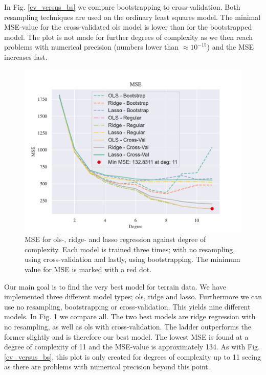 In Fig. \ref{cv_versus_bs} we compare bootstrapping to cross-validation. Both resampling techniques are used on the ordinary least squares model. The minimal MSE-value for the cross-validated ols model is lower than for the bootstrapped model. The plot is not made for further degrees of complexity as we then reach problems with numerical precision (numbers lower than $\approx 10^{-15}$) and the MSE increases fast.  

\begin{figure}[h!]
    \centering
    \includegraphics[width=1\linewidth]{project_1_alt/figures/figures_in_report/All_Terrain.pdf}
    \caption{MSE for ols-, ridge- and lasso regression against degree of complexity. Each model is trained three times; with no resampling, using cross-validation and lastly, using bootstrapping. The minimum value for MSE is marked with a red dot.}
    \label{all_terrain}
\end{figure}

Our main goal is to find the very best model for terrain data. We have implemented three different model types; ols, ridge and lasso. Furthermore we can use no resampling, bootstrapping or cross-validation. This yields nine different models. In Fig. \ref{all_terrain} we compare all. The two best models are ridge regression with no resampling, as well as ols with cross-validation. The ladder outperforms the former slightly and is therefore our best model. The lowest MSE is found at a degree of complexity of 11 and the MSE-value is approximately 134. As with Fig. \ref{cv_versus_bs}, this plot is only created for degrees of complexity up to 11 seeing as there are problems with numerical precision beyond this point. 


